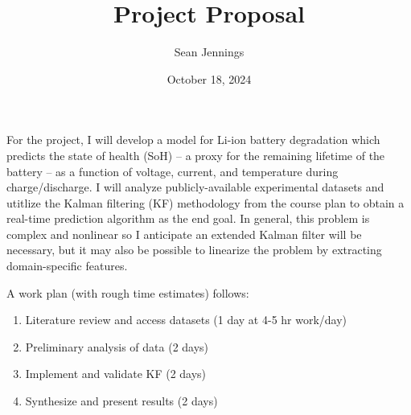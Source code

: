 \documentclass{homework}
\title{Project Proposal}
\author{Sean Jennings}
\date{October 18, 2024}
\begin{document}
\maketitle

For the project, I will develop a model for Li-ion battery degradation which
predicts the state of health (SoH) -- a proxy for the remaining lifetime of the battery -- as a function
of voltage, current, and temperature during charge/discharge. I will analyze publicly-available experimental
datasets and utitlize the Kalman filtering (KF) methodology from the course plan to obtain a
real-time prediction algorithm as the end goal. In general, this problem is complex and nonlinear so
I anticipate an extended Kalman filter will be necessary, but it may also be possible to linearize the problem
by extracting domain-specific features.

A work plan (with rough time estimates) follows:
\begin{enumerate}
\item Literature review and access datasets (1 day at 4-5 hr work/day)
\item Preliminary analysis of data (2 days)
\item Implement and validate KF (2 days)
\item Synthesize and present results (2 days)
\end{enumerate}
\end{document}
